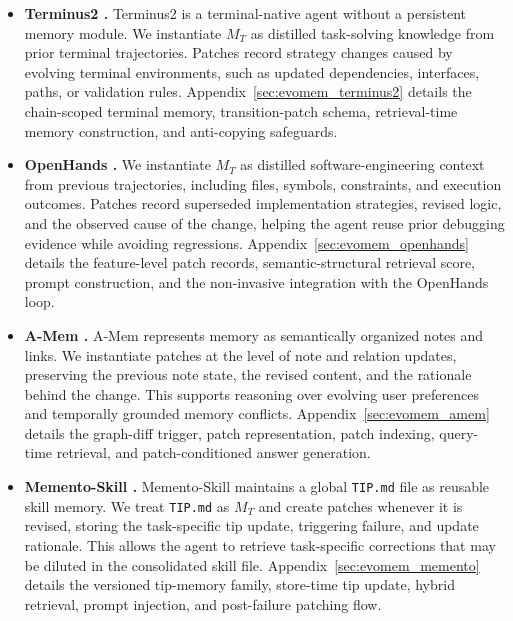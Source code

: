 \documentclass{llmxive}
\begin{document}
\begin{itemize}[leftmargin=*]
    \item \textbf{Terminus2 \cite{terminal-bench}.}
    Terminus2 is a terminal-native agent without a persistent memory module. We instantiate $M_T$ as distilled task-solving knowledge from prior terminal trajectories. Patches record strategy changes caused by evolving terminal environments, such as updated dependencies, interfaces, paths, or validation rules.  Appendix~\ref{sec:evomem_terminus2} details the chain-scoped terminal memory, transition-patch schema, retrieval-time memory construction, and anti-copying safeguards.

    \item \textbf{OpenHands \cite{openhands}.}
    We instantiate $M_T$ as distilled software-engineering context from previous trajectories, including files, symbols, constraints, and execution outcomes. Patches record superseded implementation strategies, revised logic, and the observed cause of the change, helping the agent reuse prior debugging evidence while avoiding regressions. Appendix~\ref{sec:evomem_openhands} details the feature-level patch records, semantic-structural retrieval score, prompt construction, and the non-invasive integration with the OpenHands loop.

    \item \textbf{A-Mem \cite{xu2025amem}.}
    A-Mem represents memory as semantically organized notes and links. We instantiate patches at the level of note and relation updates, preserving the previous note state, the revised content, and the rationale behind the change. This supports reasoning over evolving user preferences and temporally grounded memory conflicts. Appendix~\ref{sec:evomem_amem} details the graph-diff trigger, patch representation, patch indexing, query-time retrieval, and patch-conditioned answer generation.

    \item \textbf{Memento-Skill \cite{memento-s}.}
    Memento-Skill maintains a global \texttt{TIP.md} file as reusable skill memory. We treat \texttt{TIP.md} as $M_T$ and create patches whenever it is revised, storing the task-specific tip update, triggering failure, and update rationale. This allows the agent to retrieve task-specific corrections that may be diluted in the consolidated skill file. Appendix~\ref{sec:evomem_memento} details the versioned tip-memory family, store-time tip update, hybrid retrieval, prompt injection, and post-failure patching flow.
\end{itemize}
\end{document}
